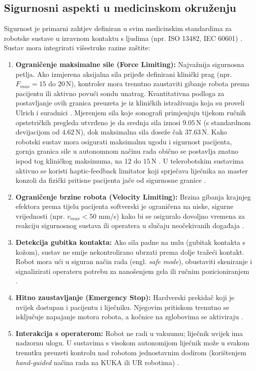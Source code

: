 \subsection{Sigurnosni aspekti u medicinskom okruženju}
Sigurnost je primarni zahtjev definiran u svim medicinskim standardima za robotske sustave u izravnom kontaktu s ljudima (npr. ISO 13482, IEC 60601) \cite{vonhaxthausen2021medical}. Sustav mora integrirati višestruke razine zaštite:
\begin{enumerate}
    \item \textbf{Ograničenje maksimalne sile (Force Limiting):} Najvažnija sigurnosna petlja. Ako izmjerena aksijalna sila prijeđe definirani klinički prag (npr. $F_{max} = 15$ do $20\,\text{N}$), kontroler mora trenutno zaustaviti gibanje robota prema pacijentu ili aktivno povući sondu unatrag. Kvantitativna podloga za postavljanje ovih granica preuzeta je iz kliničkih istraživanja koja su proveli Ulrich i suradnici \cite{ulrich2021probe}. Mjerenjem sila koje sonografi primjenjuju tijekom ručnih opstetričkih pregleda utvrđeno je da srednja sila iznosi $9.05\,\text{N}$ (s standardnom devijacijom od $4.62\,\text{N}$), dok maksimalna sila doseže čak $37.63\,\text{N}$. Kako robotski sustav mora osigurati maksimalnu ugodu i sigurnost pacijenta, gornja granica sile u autonomnom načinu rada obično se postavlja znatno ispod tog kliničkog maksimuma, na $12$ do $15\,\text{N}$ \cite{ulrich2021probe}. U telerobotskim sustavima aktivno se koristi haptic-feedback limitator koji sprječava liječnika na master konzoli da fizički pritisne pacijenta jače od sigurnosne granice \cite{ieee2025haptic}.
    \item \textbf{Ograničenje brzine robota (Velocity Limiting):} Brzina gibanja krajnjeg efektora prema tijelu pacijenta softverski je ograničena na niske, sigurne vrijednosti (npr. $v_{max} < 50$ mm/s) kako bi se osiguralo dovoljno vremena za reakciju sigurnosnog sustava ili operatera u slučaju neočekivanih događaja \cite{sae2026adaptive}.
    \item \textbf{Detekcija gubitka kontakta:} Ako sila padne na nulu (gubitak kontakta s kožom), sustav ne smije nekontrolirano ubrzati prema dolje tražeći kontakt. Robot mora ući u siguran način rada (engl. \textit{safe mode}), obustaviti skeniranje i signalizirati operateru potrebu za nanošenjem gela ili ručnim pozicioniranjem \cite{akbari2021robotic}.
    \item \textbf{Hitno zaustavljanje (Emergency Stop):} Hardverski prekidač koji je uvijek dostupan i pacijentu i liječniku. Njegovim pritiskom trenutno se isključuje napajanje motora robota, a kočnice na zglobovima se aktiviraju \cite{vonhaxthausen2021medical}.
    \item \textbf{Interakcija s operaterom:} Robot ne radi u vakuumu; liječnik uvijek ima nadzornu ulogu. U sustavima s visokom autonomijom liječnik može u svakom trenutku preuzeti kontrolu nad robotom jednostavnim dodirom (korištenjem \textit{hand-guided} načina rada na KUKA ili UR robotima) \cite{jiang2023robotic}.
\end{enumerate}
